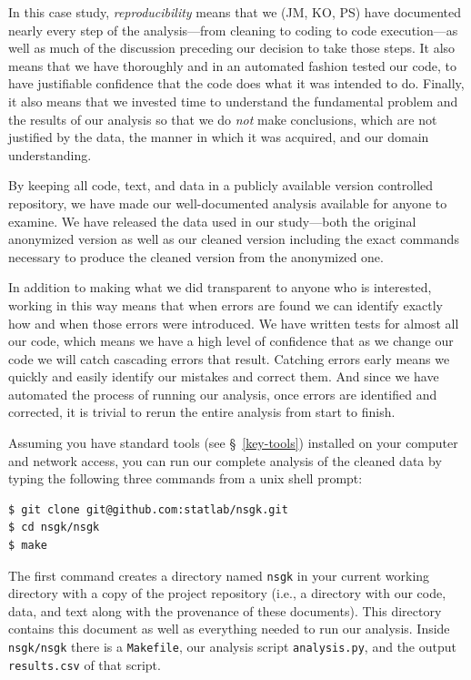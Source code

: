 \documentclass[]{article}
\begin{document}
In this case study, \emph{reproducibility} means that we (JM, KO, PS) have
documented nearly every step of the analysis---from cleaning to coding to
code execution---as well as much of the discussion preceding our decision
to take those steps.
It also means that we have thoroughly and in an automated fashion tested
our code, to have justifiable confidence that the code does what it was intended
to do.
Finally, it also means that we invested time to understand the fundamental
problem and the results of our analysis so that we do \emph{not} make
conclusions, which are not justified by the data, the manner in which it was
acquired, and our domain understanding.

By keeping all code, text, and data in a publicly available version
controlled repository, we have made our well-documented analysis available
for anyone to examine.
We have released the data used in our study---both the original anonymized
version as well as our cleaned version including the exact commands necessary
to produce the cleaned version from the anonymized one.

In addition to making what we did transparent to anyone who is interested,
working in this way means that when errors are found we can identify
exactly how and when those errors were introduced.
We have written tests for almost all our code, which means we have a high
level of confidence that as we change our code we will catch cascading
errors that result.
Catching errors early means we quickly and easily identify our mistakes and
correct them.
And since we have automated the process of running our analysis, once errors
are identified and corrected, it is trivial to rerun the entire analysis from
start to finish.

Assuming you have standard tools (see \S~\ref{key-tools}) installed on your
computer and network access, you can run our complete analysis of the cleaned
data by typing the following three commands from a unix shell prompt:
\begin{verbatim}
$ git clone git@github.com:statlab/nsgk.git
$ cd nsgk/nsgk
$ make
\end{verbatim}
The first command creates a directory named \texttt{nsgk} in your current
working directory with a copy of the project repository (i.e., a directory with
our code, data, and text along with the provenance of these documents).
This directory contains this document as well as everything needed to run our
analysis.
Inside \texttt{nsgk/nsgk} there is a \texttt{Makefile}, our analysis script
\texttt{analysis.py}, and the output \texttt{results.csv} of that script.
\end{document}
